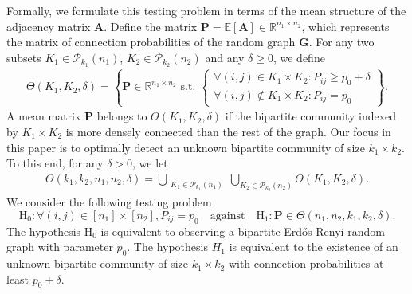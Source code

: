 \documentclass{article}
\newcommand{\R}{\mathbb{R}}
\newcommand{\A}{\mathbf{A}}
\newcommand{\bG}{\mathbf{G}}
\newcommand{\bP}{\mathbf{P}}
\newcommand{\EE}{\mathbb{E}}
\begin{document}
Formally, we formulate this testing problem %
in terms of the mean structure of the adjacency matrix $\A$. 
Define the matrix $\bP = \EE[\A] \in \R^{n_1 \times n_2}$, which represents the matrix of connection probabilities of the random graph $\bG$.
For any two subsets $K_1 \in \mathcal{P}_{k_1}(n_1)$, $K_2 \in \mathcal{P}_{k_2}(n_2)$ and any $\delta \geq 0$, we define
\begin{align*}
    \Theta(K_1, K_2, \delta) = \left\{\bP \in \R^{n_1\times n_2} \text{ s.t. } \begin{cases}
        \forall (i,j) \in K_1\times K_2: P_{ij} \geq p_0 + \delta\\
        \forall (i,j) \notin K_1\times K_2: P_{ij} = p_0
    \end{cases}
    \right\}.
\end{align*}
A mean matrix $\bP$ belongs to $\Theta(K_1, K_2, \delta)$ if the bipartite community indexed by $K_1 \times K_2$ is more densely connected than the rest of the graph. 
Our focus in this paper is to optimally detect an unknown bipartite community of size $k_1\times k_2$. 
To this end, for any $\delta>0$, we let 
\begin{align*}
    \Theta(k_1,k_2, n_1, n_2, \delta) = \bigcup_{\substack{K_1 \in \mathcal{P}_{k_1}\!(n_1) } }  \bigcup_{K_2 \in \mathcal{P}_{k_2}\!(n_2)}\Theta(K_1, K_2, \delta).
\end{align*}
We consider the following testing problem
\begin{equation}\label{eq:hypothesis-theta}
    \text{H}_0: \forall (i,j) \in [n_1] \times [n_2], P_{ij} = p_0  \quad \text{against} \quad \text{H}_1: \bP \in \Theta(n_1, n_2, k_1, k_2, \delta).
\end{equation}
The hypothesis $\text{H}_0$ is equivalent to observing a bipartite Erd\H{o}s-Renyi random graph with parameter $p_0$. 
The hypothesis $H_1$ is equivalent to the existence of an unknown bipartite community of size $k_1\times k_2$ with connection probabilities at least $p_0 + \delta$.
\end{document}

